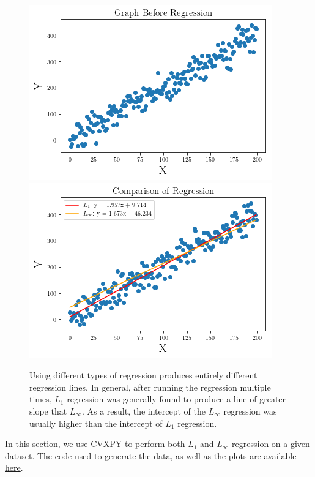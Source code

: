 \documentclass{article}
\begin{document}
\begin{figure}[h]
\centering
\includegraphics[scale = 0.6]{Line.png}
\includegraphics[scale = 0.6]{Comparison.png}
\caption{Using different types of regression produces entirely different regression lines. In general, after running the regression multiple times, $L_1$ regression was generally found to produce a line of greater slope that $L_\infty$. As a result, the intercept of the $L_\infty$ regression was usually higher than the intercept of $L_1$ regression.}
\end{figure}
In this section, we use CVXPY to perform both $L_1$ and $L_\infty$ regression on a given dataset. The code used to generate the data, as well as the plots are available \href{https://github.com/thetruejacob/CS166/blob/master/Network%20Simulation%20Assignment/Network%20Simulation.ipynb}{here}.
\end{document}
